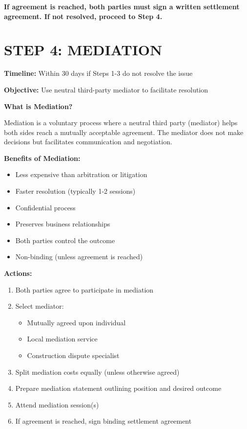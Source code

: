 \documentclass[11pt,letterpaper]{article}
\begin{document}
\vspace{6pt}

\textbf{If agreement is reached, both parties must sign a written settlement agreement. If not resolved, proceed to Step 4.}

\newpage

\section*{STEP 4: MEDIATION}

\textbf{Timeline:} Within 30 days if Steps 1-3 do not resolve the issue

\textbf{Objective:} Use neutral third-party mediator to facilitate resolution

\vspace{6pt}

\textbf{What is Mediation?}

Mediation is a voluntary process where a neutral third party (mediator) helps both sides reach a mutually acceptable agreement. The mediator does not make decisions but facilitates communication and negotiation.

\vspace{6pt}

\textbf{Benefits of Mediation:}

\begin{itemize}[leftmargin=0.5in]
\item Less expensive than arbitration or litigation
\item Faster resolution (typically 1-2 sessions)
\item Confidential process
\item Preserves business relationships
\item Both parties control the outcome
\item Non-binding (unless agreement is reached)
\end{itemize}

\vspace{6pt}

\textbf{Actions:}

\begin{enumerate}
\item Both parties agree to participate in mediation
\item Select mediator:
   \begin{itemize}
   \item Mutually agreed upon individual
   \item Local mediation service
   \item Construction dispute specialist
   \end{itemize}
\item Split mediation costs equally (unless otherwise agreed)
\item Prepare mediation statement outlining position and desired outcome
\item Attend mediation session(s)
\item If agreement is reached, sign binding settlement agreement
\end{enumerate}
\end{document}
